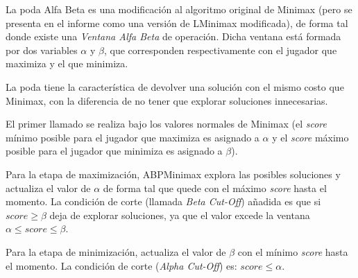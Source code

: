 \documentclass[10pt,a4paper,notitlepage]{article}
\begin{document}
La poda Alfa Beta es una modificación al algoritmo original de Minimax (pero se presenta en el informe como una versión de LMinimax modificada), de forma tal donde existe una \textit{Ventana Alfa Beta} de operación. Dicha ventana está formada por dos variables $\alpha$ y $\beta$, que corresponden respectivamente con el jugador que maximiza y el que minimiza.

La poda tiene la característica de devolver una solución con el mismo costo que Minimax, con la diferencia de no tener que explorar soluciones innecesarias.

El primer llamado se realiza bajo los valores normales de Minimax (el \textit{score} mínimo posible para el jugador que maximiza es asignado a $\alpha$ y el \textit{score} máximo posible para el jugador que minimiza es asignado a $\beta$).

Para la etapa de maximización, ABPMinimax explora las posibles soluciones y actualiza el valor de $\alpha$ de forma tal que quede con el máximo \textit{score} hasta el momento. La condición de corte (llamada \textit{Beta Cut-Off}) añadida es que si $score \geq \beta$ deja de explorar soluciones, ya que el valor excede la ventana $\alpha \leq score \leq \beta$.

Para la etapa de minimización, actualiza el valor de $\beta$ con el mínimo \textit{score} hasta el momento. La condición de corte (\textit{Alpha Cut-Off}) es: $score \leq \alpha$.
\end{document}

